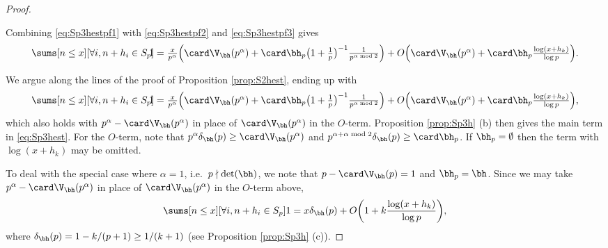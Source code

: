 \documentclass[12pt, reqno, twoside, letterpaper]{amsart}
\begin{document}
\begin{nix}
\begin{proof}
\begin{nixnix}
Combining \eqref{eq:Sp3hestpf1} with \eqref{eq:Sp3hestpf2} and 
\eqref{eq:Sp3hestpf3} gives
\begin{align*}
   \sums[n \le x][\forall i, n + h_i \in S_p] \hspace{-5pt} 1
  = 
  \textstyle 
   \frac{x}{p^{\alpha}}
    \Big(\card \V_{\bh}(p^{\alpha}) + \card \bh_p\big(1 + \frac{1}{p}\big)^{-1}\frac{1}{p^{\alpha \bmod 2}}\Big)
     + 
      O\Big(
        \card \V_{\bh}(p^{\alpha})+ \card\bh_p \frac{\log(x + h_k)}{\log p} 
       \Big).
\end{align*}
%
\end{nixnix}
%
%
We argue along the lines of the proof of 
Proposition \ref{prop:S2hest}, ending up with  
\begin{align*}
   \sums[n \le x][\forall i, n + h_i \in S_p] \hspace{-5pt} 1
  = 
  \textstyle 
   \frac{x}{p^{\alpha}}
    \Big(\card \V_{\bh}(p^{\alpha}) + \card \bh_p\big(1 + \frac{1}{p}\big)^{-1}\frac{1}{p^{\alpha \bmod 2}}\Big)
     + 
      O\Big(
        \card \V_{\bh}(p^{\alpha})+ \card\bh_p \frac{\log(x + h_k)}{\log p} 
       \Big),
\end{align*}
which also holds with $p^{\alpha} - \card \V_{\bh}(p^{\alpha})$ in 
place of $\card \V_{\bh}(p^{\alpha})$ in the $O$-term. 
%
Proposition \ref{prop:Sp3h} (b) then gives the main term in 
\eqref{eq:Sp3hest}.
%
For the $O$-term, note that 
$
 p^{\alpha}\delta_{\bh}(p)
  \ge 
   \card \V_{\bh}(p^{\alpha})  
$
and 
$
 p^{\alpha + \alpha \bmod 2}\delta_{\bh}(p) 
  \ge 
   \card \bh_p
$.
%
If $\bh_p = \emptyset$ then the term with $\log(x + h_k)$ may be 
omitted.

To deal with the special case where $\alpha = 1$, i.e.\ 
$p \nmid \det(\bh)$, we note that $p - \card \V_{\bh}(p) = 1$ and 
$\bh_p = \bh$.
%
Since we may take $p^{\alpha} - \card \V_{\bh}(p^{\alpha})$ in place 
of $\card \V_{\bh}(p^{\alpha})$ in the $O$-term above, 
\[
 \sums[n \le x][\forall i, n + h_i \in S_p] 1
  =
   x\delta_{\bh}(p)
     + 
      O\bigg(
        1 + k\frac{\log(x + h_k)}{\log p} 
       \bigg),
\]
where $\delta_{\bh}(p) = 1 - k/(p + 1) \ge 1/(k + 1)$ (see 
Proposition \ref{prop:Sp3h} (c)).
\end{proof}

\end{nix}
\end{document}

